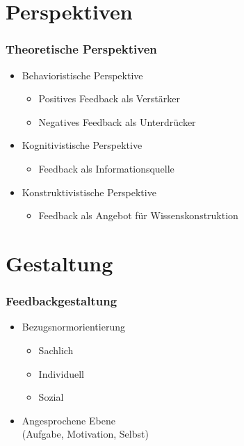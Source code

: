 \section{Perspektiven}

\begin{frame}[<+->]
	\frametitle{Theoretische Perspektiven}
	\begin{itemize}
		\item Behavioristische Perspektive
		\begin{itemize}
			\item Positives Feedback als Verstärker
			\item Negatives Feedback als Unterdrücker
		\end{itemize}
		\item Kognitivistische Perspektive
		\begin{itemize}
			\item Feedback als Informationsquelle
		\end{itemize}
		\item Konstruktivistische Perspektive
		\begin{itemize}
		\item Feedback als Angebot für Wissenskonstruktion
		\end{itemize}
	\end{itemize}
\end{frame}

\section{Gestaltung}

\begin{frame}[<+->]
	\frametitle{Feedbackgestaltung}
	\begin{itemize}
		\item Bezugsnormorientierung
		\begin{itemize}
			\item Sachlich
			\item Individuell
			\item Sozial
		\end{itemize}
		\item Angesprochene Ebene\\
			(Aufgabe, Motivation, Selbst)
	\end{itemize}
\end{frame}

